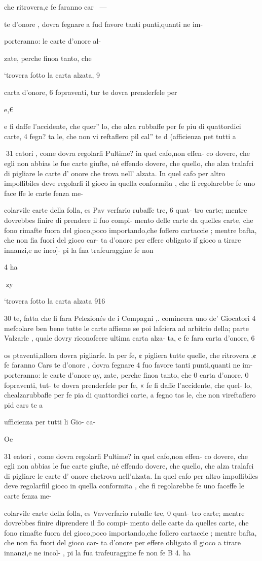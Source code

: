 {{{{{{{{{{{{{{che ritrovera,¢ fe faranno car~ —

te d’onore , dovra fegnare a fud
favore tanti punti,quanti ne im-

porteranno: le carte d’onore al-

zate, perche finoa tanto, che

‘trovera fotto la carta alzata, 9

carta d’onore, 6 fopraventi, tur
te dovra prenderfele per {e,€

{e fi daffe l’accidente, che quer”
lo, che alza rubbaffe per fe piu
di quattordici carte, 4 fegn? ta
le, che non vi reftaflero pil cal”
te d (afficienza pet tutti a

 
31
catori , come dovra regolarfi
Pultime? in quel cafo,non effen-
co dovere, che egli non abbias
le fue carte giufte, né effendo
dovere, che quello, che alza
tralafci di pigliare le carte d’
onore che trova nell’ alzata. In
quel cafo per altro impoffibiles
deve regolarfi il gioco in quella
conformita , che fi regolarebbe
fe uno face ffe le carte fenza me-
{colarvile carte della folla, es
Pav verfario rubaffe tre, 6 quat-
tro carte; mentre dovrebbes
finire di prendere il fuo compi-
mento delle carte da quelles
carte, che fono rimafte fuora
del gioco,poco importando,che
foflero cartaccie ; mentre bafta,
che non fia fuori del gioco car-
ta d’onore per effere obligato if
gioco a tirare innanzi,e ne inco]-
pi la fna trafeuraggine fe non

4 ha

 

 
zy

‘trovera fotto la carta alzata 916

30
te, fatta che fi fara Pelezionés
de i Compagni ,. comincera uno
de’ Giocatori 4 mefcolare ben
bene tutte le carte affieme se
poi lafciera ad arbitrio della;
parte Valzarle , quale dovry
riconofcere ultima carta alza-
ta, e fe fara carta d’onore, 6 {os
ptaventi,allora dovra pigliarfe.
la per fe, ¢ pigliera tutte quelle,
che ritrovera ,¢ fe faranno Cars
te d’onore , dovra fegnare 4 fuo
favore tanti punti,quanti ne im-
porteranno: le carte d’onore ay,
zate, perche finoa tanto, che
0
carta d’onore, 0 fopraventi, tut-
te dovra prenderfele per fe, «
fe fi daffe l’accidente, che quel-
lo, chealzarubbafle per fe pia
di quattordici carte, a fegno tas
le, che non vireftaflero pid cars
te a {ufficienza per tutti li Gio-
ca-
 

Oe

31
eatori , come dovra regolarfi
Pultime? in quel cafo,non effen-
co dovere, che egli non abbias
le fue carte giufte, né effendo
dovere, che quello, che alza
tralafci di pigliare le carte d’
onore chetrova nell’alzata. In
quel cafo per altro impoflibiles
deve regolarfiil gioco in quella
conformita , che fi regolarebbe
fe uno faceffe le carte fenza me-
{colarvile carte della folla, es
Vavverfario rubafle tre, 0 quat-
tro carte; mentre dovrebbes
finire diprendere il flo compi-
mento delle carte da quelles
carte, che fono rimafte fuora
del gioco,poco importando,che
follero cartaccie ; mentre bafta,
che non fia fuori del gioco car-
ta d’onore per effere obligato il
gioco a tirare innanzi,e ne incol-
, pi la fua trafeuraggine fe non
fe B 4. ha
 

}}}}}}}}}}}}}}}}}}}}

